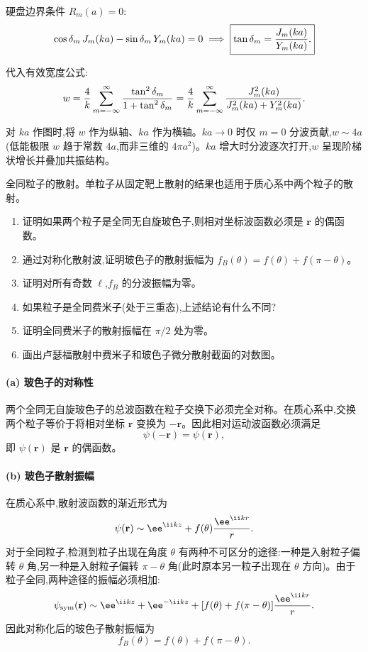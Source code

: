 \begin{question}
\begin{solution}
硬盘边界条件 $R_m(a)=0$:
\[
\cos\delta_m\,J_m(ka)-\sin\delta_m\,Y_m(ka)=0
\;\Longrightarrow\;
\boxed{\tan\delta_m={J_m(ka)\over Y_m(ka)}.}
\]

代入有效宽度公式:
\[
w={4\over k}\sum_{m=-\infty}^{\infty}{\tan^2\delta_m\over1+\tan^2\delta_m}
={4\over k}\sum_{m=-\infty}^{\infty}{J_m^2(ka)\over J_m^2(ka)+Y_m^2(ka)}.
\]

对 $ka$ 作图时,将 $w$ 作为纵轴、$ka$ 作为横轴。$ka\to0$ 时仅 $m=0$ 分波贡献,$w\sim4a$(低能极限 $w$ 趋于常数 $4a$,而非三维的 $4\pi a^2$)。$ka$ 增大时分波逐次打开,$w$ 呈现阶梯状增长并叠加共振结构。
\end{solution}
\end{question}

\begin{question}
全同粒子的散射。单粒子从固定靶上散射的结果也适用于质心系中两个粒子的散射。
\begin{enumerate}
\item 证明如果两个粒子是全同无自旋玻色子,则相对坐标波函数必须是 $\mathbf r$ 的偶函数。
\item 通过对称化散射波,证明玻色子的散射振幅为 $f_B(\theta)=f(\theta)+f(\pi-\theta)$。
\item 证明对所有奇数 $\ell$,$f_B$ 的分波振幅为零。
\item 如果粒子是全同费米子(处于三重态),上述结论有什么不同?
\item 证明全同费米子的散射振幅在 $\pi/2$ 处为零。
\item 画出卢瑟福散射中费米子和玻色子微分散射截面的对数图。
\end{enumerate}
\begin{solution}
\paragraph{(a) 玻色子的对称性}

两个全同无自旋玻色子的总波函数在粒子交换下必须完全对称。在质心系中,交换两个粒子等价于将相对坐标 $\mathbf r$ 变换为 $-\mathbf r$。因此相对运动波函数必须满足
\[
\psi(-\mathbf r)=\psi(\mathbf r),
\]
即 $\psi(\mathbf r)$ 是 $\mathbf r$ 的偶函数。

\paragraph{(b) 玻色子散射振幅}

在质心系中,散射波函数的渐近形式为
\[
\psi(\mathbf r)\sim \ee^{\ii kz}+f(\theta){\ee^{\ii kr}\over r}.
\]
对于全同粒子,检测到粒子出现在角度 $\theta$ 有两种不可区分的途径:一种是入射粒子偏转 $\theta$ 角,另一种是入射粒子偏转 $\pi-\theta$ 角(此时原本另一粒子出现在 $\theta$ 方向)。由于粒子全同,两种途径的振幅必须相加:
\[
\psi_{\text{sym}}(\mathbf r)\sim \ee^{\ii kz}+\ee^{-\ii kz}+[f(\theta)+f(\pi-\theta)]{\ee^{\ii kr}\over r}.
\]
因此对称化后的玻色子散射振幅为
\[
\boxed{f_B(\theta)=f(\theta)+f(\pi-\theta).}
\]


\end{solution}
\end{question}
